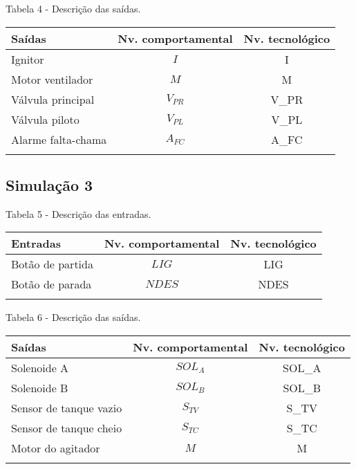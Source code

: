 Tabela 4 - Descrição das saídas.

\begin{longtable}[]{@{}lcc@{}}
\toprule
Saídas & Nv. comportamental & Nv. tecnológico \\
\midrule
\endhead
Ignitor & \(I\) & I \\
Motor ventilador & \(M\) & M \\
Válvula principal & \(V_{PR}\) & V\_PR \\
Válvula piloto & \(V_{PL}\) & V\_PL \\
Alarme falta-chama & \(A_{FC}\) & A\_FC \\
\bottomrule
\label{tbl:4}
\end{longtable}

\hypertarget{simulauxe7uxe3o-3}{%
\subsection{Simulação 3}\label{simulauxe7uxe3o-3}}

Tabela 5 - Descrição das entradas.

\begin{longtable}[]{@{}lcc@{}}
\toprule
Entradas & Nv. comportamental & Nv. tecnológico \\
\midrule
\endhead
Botão de partida & $LIG$ & LIG \\
Botão de parada & $NDES$ & NDES \\
\bottomrule
\label{tbl:5}
\end{longtable}

Tabela 6 - Descrição das saídas.

\begin{longtable}[]{@{}lcc@{}}
\toprule
Saídas & Nv. comportamental & Nv. tecnológico \\
\midrule
\endhead
Solenoide A & \(SOL_A\) & SOL\_A \\
Solenoide B & \(SOL_B\) & SOL\_B \\
Sensor de tanque vazio & \(S_{TV}\) & S\_TV \\
Sensor de tanque cheio & \(S_{TC}\) & S\_TC \\
Motor do agitador & \(M\) & M \\
\bottomrule
\label{tbl:6}
\end{longtable}
